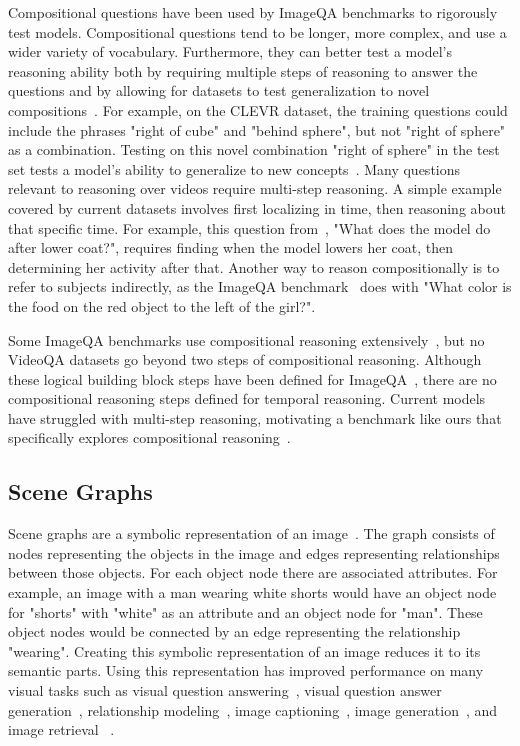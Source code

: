 \documentclass[10pt,twocolumn,letterpaper]{article}
\begin{document}
Compositional questions have been used by ImageQA benchmarks to rigorously test models. Compositional questions tend to be longer, more complex, and use a wider variety of vocabulary. Furthermore, they can better test a model's reasoning ability both by requiring multiple steps of reasoning to answer the questions and by allowing for datasets to test generalization to novel compositions~\cite{johnson2017clevr,hudson2019gqa,lake2018generalization}. For example, on the CLEVR dataset, the training questions could include the phrases "right of cube" and "behind sphere", but not "right of sphere" as a combination. Testing on this novel combination "right of sphere" in the test set tests a model's ability to generalize to new concepts~\cite{lake2018generalization,johnson2017clevr}. Many questions relevant to reasoning over videos require multi-step reasoning. A simple example covered by current datasets involves first localizing in time, then reasoning about that specific time. For example, this question from~\cite{jang2017tgif}, "What does the model do after
lower coat?", requires finding when the model lowers her coat, then determining her activity after that. Another way to reason compositionally is to refer to subjects indirectly, as the ImageQA benchmark~\cite{hudson2019gqa} does with "What color is the food on the red object to the left of the girl?". 

Some ImageQA benchmarks use compositional reasoning extensively~\cite{johnson2017clevr,hudson2019gqa}, but no VideoQA datasets go beyond two steps of compositional reasoning. Although these logical building block steps have been defined for ImageQA~\cite{cheng2015break}, there are no compositional reasoning steps defined for temporal reasoning. Current models have struggled with multi-step reasoning, motivating a benchmark like ours that specifically explores compositional reasoning~\cite{fan2019heterogeneous}.


\subsection{Scene Graphs}

Scene graphs are a symbolic representation of an image~\cite{krishna2017visual}. The graph consists of nodes representing the objects in the image and edges representing relationships between those objects. For each object node there are associated attributes. For example, an image with a man wearing white shorts would have an object node for "shorts" with "white" as an attribute and an object node for "man". These object nodes would be connected by an edge representing the relationship "wearing". Creating this symbolic representation of an image reduces it to its semantic parts. Using this representation has improved performance on many visual tasks such as visual question answering~\cite{johnson2017inferring}, visual question answer generation~\cite{hudson2019gqa}, relationship modeling~\cite{krishna2018referring}, image captioning~\cite{anderson2016spice}, image generation~\cite{johnson2018image,ashual2019specifying}, and image retrieval ~\cite{ashual2019specifying,johnson2015image}.
\end{document}

